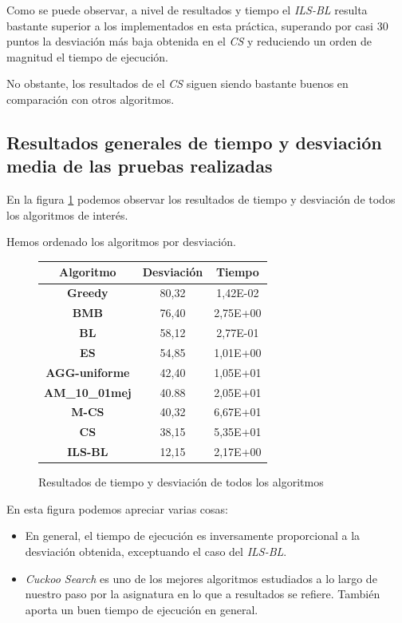 Como se puede observar, a nivel de resultados y tiempo el \textit{ILS-BL} resulta bastante superior a los implementados en esta práctica, superando por casi 30 puntos la desviación más baja obtenida en el \textit{CS} y reduciendo un orden de magnitud el tiempo de ejecución.

No obstante, los resultados de el \textit{CS} siguen siendo bastante buenos en comparación con otros algoritmos.

\subsection{Resultados generales de tiempo y desviación media de las pruebas realizadas}

En la figura \ref{tab:compTotal} podemos observar los resultados de tiempo y desviación de todos los algoritmos de interés.

Hemos ordenado los algoritmos por desviación.

\begin{figure}[H]
    \centering
    \begin{tabular}{|c|c|c|}
        \hline
        Algoritmo & \textbf{Desviación} & \textbf{Tiempo}\\
        \hline
        \textbf{Greedy} & 80,32 & 1,42E-02\\
        \hline
        \textbf{BMB} & 76,40 & 2,75E+00\\
        \hline
        \textbf{BL} & 58,12 & 2,77E-01\\
        \hline
        \textbf{ES} & 54,85 & 1,01E+00\\
        \hline
        \textbf{AGG-uniforme} & 42,40 & 1,05E+01\\
        \hline
        \textbf{AM\_10\_01mej} & 40.88 & 2,05E+01\\
        \hline
        \textbf{M-CS} & 40,32 & 6,67E+01\\
        \hline
        \textbf{CS} & 38,15 & 5,35E+01\\
        \hline
        \textbf{ILS-BL} & 12,15 & 2,17E+00\\
        \hline
    \end{tabular}
    \caption{Resultados de tiempo y desviación de todos los algoritmos}
    \label{tab:compTotal}
\end{figure}

En esta figura podemos apreciar varias cosas:

\begin{itemize}
    \item En general, el tiempo de ejecución es inversamente proporcional a la desviación obtenida, exceptuando el caso del \textit{ILS-BL}.
    \item \textit{Cuckoo Search} es uno de los mejores algoritmos estudiados a lo largo de nuestro paso por la asignatura en lo que a resultados se refiere. También aporta un buen tiempo de ejecución en general.
\end{itemize}


